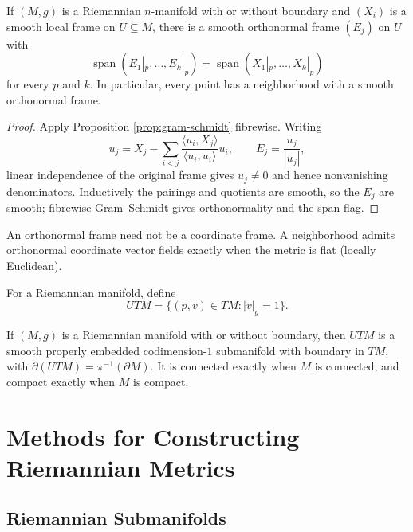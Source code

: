 \begin{proposition}
\label{prop:existence-orthonormal-frames}
\leanok
{}
If $(M,g)$ is a Riemannian $n$-manifold with or without boundary and $(X_i)$ is a smooth local frame on $U\subseteq M$, there is a smooth orthonormal frame $(E_j)$ on $U$ with
\[
\operatorname{span}(E_1|_p,\ldots,E_k|_p)=\operatorname{span}(X_1|_p,\ldots,X_k|_p)
\]
for every $p$ and $k$. In particular, every point has a neighborhood with a smooth orthonormal frame.
\end{proposition}
\begin{proof}
\leanok
{}
\sketch Apply Proposition \ref{prop:gram-schmidt} fibrewise. Writing
\[
u_j=X_j-\sum_{i<j}\frac{\langle u_i,X_j\rangle}{\langle u_i,u_i\rangle}u_i,
\qquad E_j=\frac{u_j}{|u_j|},
\]
linear independence of the original frame gives $u_j\ne0$ and hence nonvanishing denominators. Inductively the pairings and quotients are smooth, so the $E_j$ are smooth; fibrewise Gram--Schmidt gives orthonormality and the span flag.
\end{proof}

\begin{remark}
\label{rem:coordinate-frame-warning}
An orthonormal frame need not be a coordinate frame. A neighborhood admits orthonormal coordinate vector fields exactly when the metric is flat (locally Euclidean).
\end{remark}

For a Riemannian manifold, define
\[
UTM=\{(p,v)\in TM:|v|_g=1\}.\tag{2.10}
\]
\begin{proposition}
\label{prop:unit-tangent-bundle-properties}
If $(M,g)$ is a Riemannian manifold with or without boundary, then $UTM$ is a smooth properly embedded codimension-$1$ submanifold with boundary in $TM$, with $\partial(UTM)=\pi^{-1}(\partial M)$. It is connected exactly when $M$ is connected, and compact exactly when $M$ is compact.
\end{proposition}

\section{Methods for Constructing Riemannian Metrics}

\subsection*{Riemannian Submanifolds}

